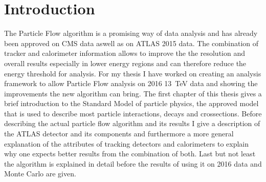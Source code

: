 \chapter{Introduction}
\label{sec:intro}


The Particle Flow algorithm is a promising way of data analysis and has already been approved on CMS data aswell as on ATLAS 2015 data. The combination of tracker  and calorimeter information allows to improve the the resolution and overall results especially in lower energy regions and can therefore reduce the energy threshold for analysis. For my thesis I have worked on creating an analysis framework to allow Particle Flow analysis on 2016 \SI{13}{\TeV} data and showing the improvements the new algorithm can bring.
The first chapter of this thesis gives a brief introduction to the Standard Model of particle physics, the approved model that is used to describe most particle interactions, decays and crossections.
Before describing the actual particle flow algorithm and its results I give a description of the ATLAS detector and its components and furthermore a more general explanation of the attributes of tracking detectors and calorimeters to explain why one expects better results from the combination of both.
Last but not least the algorithm is explained in detail before the results of using it on 2016 data and Monte Carlo are given.

